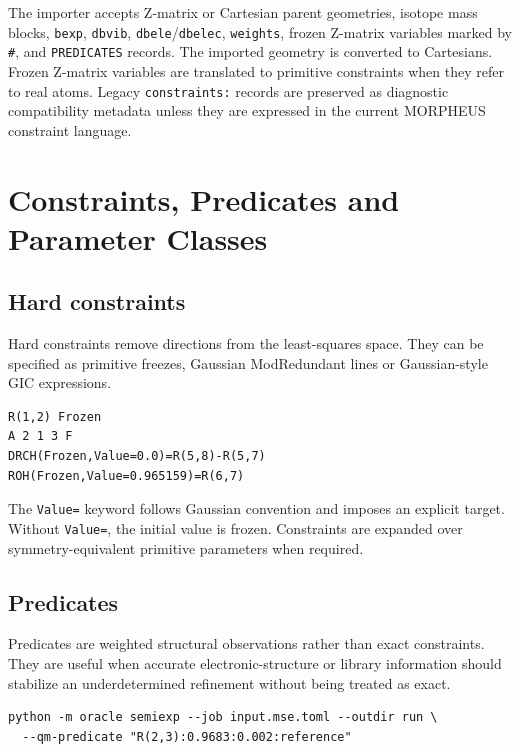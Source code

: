 \documentclass[11pt]{article}
\begin{document}
The importer accepts Z-matrix or Cartesian parent geometries, isotope mass
blocks, \texttt{bexp}, \texttt{dbvib}, \texttt{dbele}/\texttt{dbelec},
\texttt{weights}, frozen Z-matrix variables marked by \texttt{\#}, and
\texttt{PREDICATES} records.  The imported geometry is converted to Cartesians.
Frozen Z-matrix variables are translated to primitive constraints when they
refer to real atoms.  Legacy \texttt{constraints:} records are preserved as
diagnostic compatibility metadata unless they are expressed in the current MORPHEUS
constraint language.

\section{Constraints, Predicates and Parameter Classes}

\subsection{Hard constraints}

Hard constraints remove directions from the least-squares space.  They can be
specified as primitive freezes, Gaussian ModRedundant lines or Gaussian-style
GIC expressions.

\begin{lstlisting}[style=oracle]
R(1,2) Frozen
A 2 1 3 F
DRCH(Frozen,Value=0.0)=R(5,8)-R(5,7)
ROH(Frozen,Value=0.965159)=R(6,7)
\end{lstlisting}

\noindent
The \texttt{Value=} keyword follows Gaussian convention and imposes an explicit
target.  Without \texttt{Value=}, the initial value is frozen.  Constraints are
expanded over symmetry-equivalent primitive parameters when required.

\subsection{Predicates}

Predicates are weighted structural observations rather than exact constraints.
They are useful when accurate electronic-structure or library information
should stabilize an underdetermined refinement without being treated as exact.

\begin{lstlisting}[style=oracle]
python -m oracle semiexp --job input.mse.toml --outdir run \
  --qm-predicate "R(2,3):0.9683:0.002:reference"
\end{lstlisting}
\end{document}

